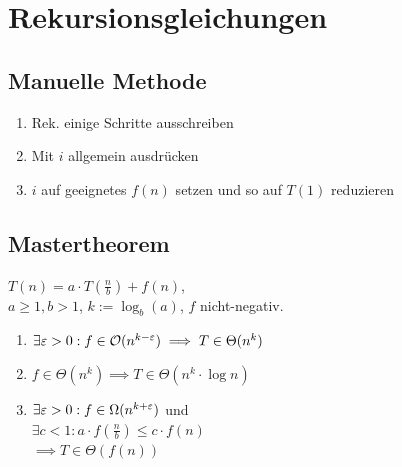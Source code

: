 \section*{Rekursionsgleichungen}

\subsection*{Manuelle Methode}
\begin{enumerate}
	\item Rek. einige Schritte ausschreiben
	\item Mit $i$ allgemein ausdrücken
	\item $i$ auf geeignetes $f(n)$ setzen und so auf $T(1)$ reduzieren
\end{enumerate}

\subsection*{Mastertheorem}
$T(n) = a\cdot T(\frac{n}{b}) + f(n)$, \\
$a \ge 1, b > 1$, $k:=\log_b(a)$, $f$ nicht-negativ.
\begin{enumerate}
	\item $\exists\varepsilon>0: f \in \mathcal{O}(n^{k - \varepsilon}) \implies T \in \Theta(n^k)$
	\item $f \in \Theta(n^k) \implies T \in \Theta(n^k \cdot \log n)$
	\item $\exists\varepsilon>0: f \in \Omega(n^{k + \varepsilon})$ und \\
		$\exists c<1: a\cdot f(\frac{n}{b}) \le c\cdot f(n)$ \\
		$\implies T \in \Theta(f(n))$
\end{enumerate}
